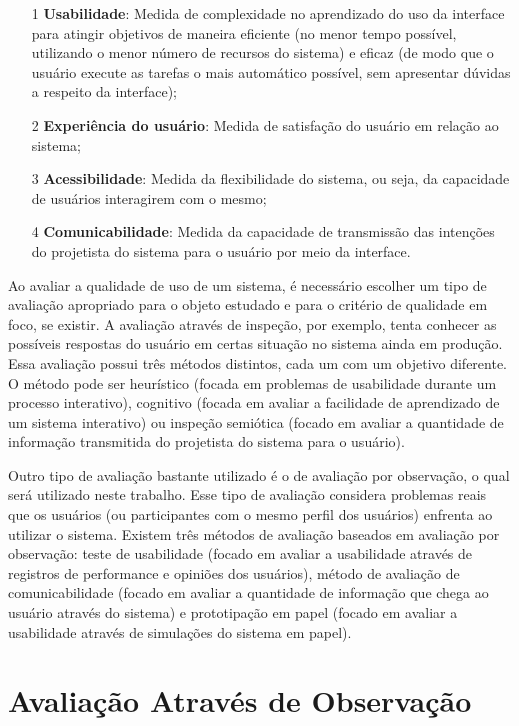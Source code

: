 \begin{itemize}
\item[1] \textbf{Usabilidade}: Medida de complexidade no aprendizado do uso da interface para atingir objetivos de maneira eficiente (no menor tempo possível, utilizando o menor número de recursos do sistema) e eficaz (de modo que o usuário execute as tarefas o mais automático possível, sem apresentar dúvidas a respeito da interface);
\item[2] \textbf{Experiência do usuário}: Medida de satisfação do usuário em relação ao sistema;
\item[3] \textbf{Acessibilidade}: Medida da flexibilidade do sistema, ou seja, da capacidade de usuários interagirem com o mesmo;
\item[4] \textbf{Comunicabilidade}: Medida da capacidade de transmissão das intenções do projetista do sistema para o usuário por meio da interface. %
\end{itemize}

\indent Ao avaliar a qualidade de uso de um sistema, é necessário escolher um tipo de avaliação apropriado para o objeto estudado e para o critério de qualidade em foco, se existir. A avaliação através de inspeção, por exemplo, tenta conhecer as possíveis respostas do usuário em certas situação no sistema ainda em produção. Essa avaliação possui três métodos distintos, cada um com um objetivo diferente. O método pode ser heurístico (focada em problemas de usabilidade durante um processo interativo), cognitivo (focada em avaliar a facilidade de aprendizado de um sistema interativo) ou inspeção semiótica (focado em avaliar a quantidade de informação transmitida do projetista do sistema para o usuário).

\indent Outro tipo de avaliação bastante utilizado é o de avaliação por observação, o qual será utilizado neste trabalho. Esse tipo de avaliação considera problemas reais que os usuários (ou participantes com o mesmo perfil dos usuários) enfrenta ao utilizar o sistema. Existem três métodos de avaliação baseados em avaliação por observação: teste de usabilidade (focado em avaliar a usabilidade através de registros de performance e opiniões dos usuários), método de avaliação de comunicabilidade (focado em avaliar a quantidade de informação que chega ao usuário através do sistema) e prototipação em papel (focado em avaliar a usabilidade através de simulações do sistema em papel).  

\section{Avaliação Através de Observação} \label{avaObs}

